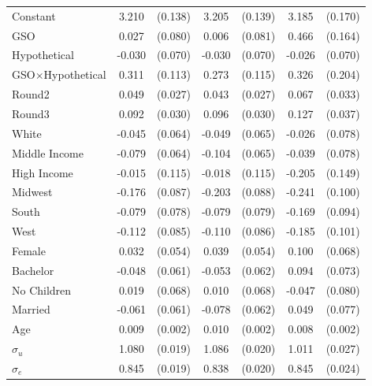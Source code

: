 \documentclass[12pt]{article}
\newcommand{\sym}[1]{\rlap{$^{#1}$}}
\begin{document}
\begin{table}[H]
{\begin{tabular}{l*{3}{cc}}
Constant    &       3.210\sym{***}&     (0.138)&       3.205\sym{***}&     (0.139)&       3.185\sym{***}&     (0.170)\\
GSO         &       0.027         &     (0.080)&       0.006         &     (0.081)&       0.466\sym{***}&     (0.164)\\
Hypothetical&      -0.030         &     (0.070)&      -0.030         &     (0.070)&      -0.026         &     (0.070)\\
GSO$\times$Hypothetical&       0.311\sym{***}&     (0.113)&       0.273\sym{**} &     (0.115)&       0.326         &     (0.204)\\
Round2      &       0.049\sym{*}  &     (0.027)&       0.043         &     (0.027)&       0.067\sym{**} &     (0.033)\\
Round3      &       0.092\sym{***}&     (0.030)&       0.096\sym{***}&     (0.030)&       0.127\sym{***}&     (0.037)\\
White       &      -0.045         &     (0.064)&      -0.049         &     (0.065)&      -0.026         &     (0.078)\\
Middle Income&      -0.079         &     (0.064)&      -0.104         &     (0.065)&      -0.039         &     (0.078)\\
High Income &      -0.015         &     (0.115)&      -0.018         &     (0.115)&      -0.205         &     (0.149)\\
Midwest     &      -0.176\sym{**} &     (0.087)&      -0.203\sym{**} &     (0.088)&      -0.241\sym{**} &     (0.100)\\
South       &      -0.079         &     (0.078)&      -0.079         &     (0.079)&      -0.169\sym{*}  &     (0.094)\\
West        &      -0.112         &     (0.085)&      -0.110         &     (0.086)&      -0.185\sym{*}  &     (0.101)\\
Female      &       0.032         &     (0.054)&       0.039         &     (0.054)&       0.100         &     (0.068)\\
Bachelor    &      -0.048         &     (0.061)&      -0.053         &     (0.062)&       0.094         &     (0.073)\\
No Children &       0.019         &     (0.068)&       0.010         &     (0.068)&      -0.047         &     (0.080)\\
Married     &      -0.061         &     (0.061)&      -0.078         &     (0.062)&       0.049         &     (0.077)\\
Age         &       0.009\sym{***}&     (0.002)&       0.010\sym{***}&     (0.002)&       0.008\sym{***}&     (0.002)\\
\hline
$\sigma_u$     &       1.080\sym{***}&     (0.019)&       1.086\sym{***}&     (0.020)&       1.011\sym{***}&     (0.027)\\
$\sigma_e$     &       0.845\sym{***}&     (0.019)&       0.838\sym{***}&     (0.020)&       0.845\sym{***}&     (0.024)\\


\end{tabular}}
\end{table}
\end{document}
